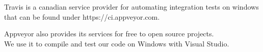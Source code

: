 Travis is a canadian service provider for automating integration tests on windows that can be found under https://ci.appveyor.com.

Appveyor also provides its services for free to open source projects. \cite{appveyorpricing} \\
We use it to compile and test our code on Windows with Visual Studio.
